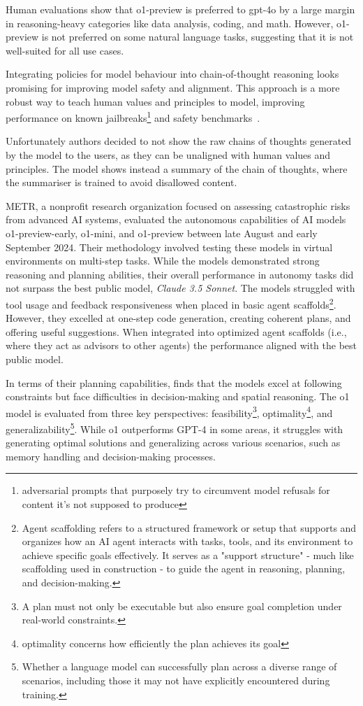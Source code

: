 Human evaluations show that o1-preview is preferred to gpt-4o by a large margin in reasoning-heavy categories like data analysis, coding, and math.
However, o1-preview is not preferred on some natural language tasks, suggesting that it is not well-suited for all use cases.

Integrating policies for model behaviour into chain-of-thought reasoning looks promising for improving model safety and alignment.
This approach is a more robust way to teach human values and principles to model, improving performance on known jailbreaks\footnote{adversarial prompts that purposely try to circumvent model refusals for content it’s not supposed to produce} and safety benchmarks~\cite{openai2024openaio1card}.

Unfortunately authors decided to not show the raw chains of thoughts generated by the model to the users, as they can be unaligned with human values and principles.
The model shows instead a summary of the chain of thoughts, where the summariser is trained to avoid disallowed content.

METR, a nonprofit research organization focused on assessing catastrophic risks from advanced AI systems, evaluated the autonomous capabilities of AI models o1-preview-early, o1-mini, and o1-preview between late August and early September 2024.
Their methodology involved testing these models in virtual environments on multi-step tasks.
While the models demonstrated strong reasoning and planning abilities, their overall performance in autonomy tasks did not surpass the best public model, \textit{Claude 3.5 Sonnet}.
The models struggled with tool usage and feedback responsiveness when placed in basic agent scaffolds\footnote{
	Agent scaffolding refers to a structured framework or setup that supports and organizes how an AI agent interacts with tasks, tools, and its environment to achieve specific goals effectively. It serves as a "support structure" - much like scaffolding used in construction - to guide the agent in reasoning, planning, and decision-making.
}.
However, they excelled at one-step code generation, creating coherent plans, and offering useful suggestions.
When integrated into optimized agent scaffolds (i.e., where they act as advisors to other agents) the performance aligned with the best public model.

In terms of their planning capabilities, \textcite{wang2024planningabilitiesopenaiso1} finds that the models excel at following constraints but face difficulties in decision-making and spatial reasoning.
The o1 model is evaluated from three key perspectives: feasibility\footnote{A plan must not only be executable but also ensure goal completion under real-world constraints.}, optimality\footnote{optimality concerns how efficiently the plan achieves its goal}, and generalizability\footnote{Whether a language model can successfully plan across a diverse range of scenarios, including those it may not have explicitly encountered during training.}.
While o1 outperforms GPT-4 in some areas, it struggles with generating optimal solutions and generalizing across various scenarios, such as memory handling and decision-making processes.

